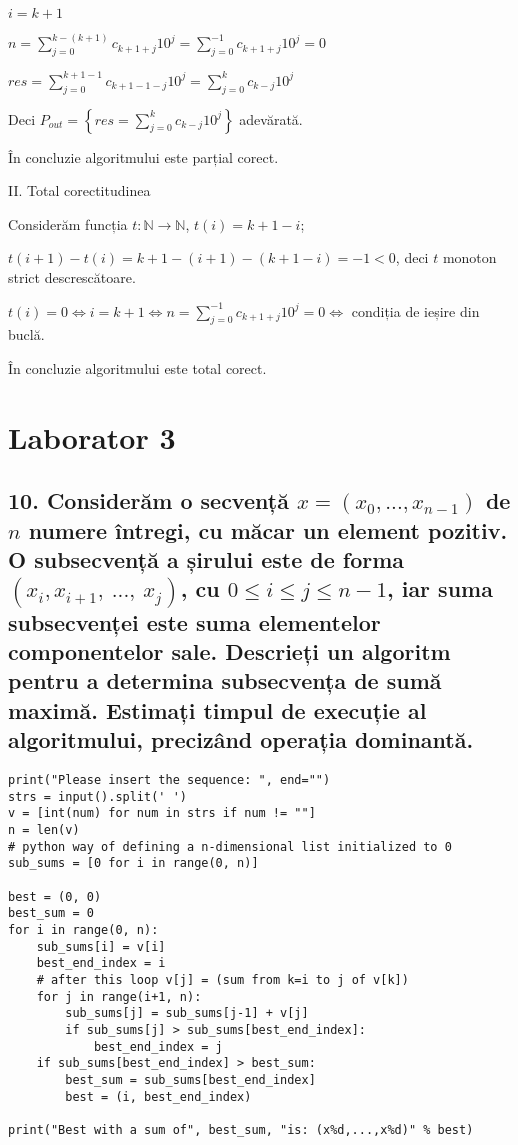 \documentclass[11pt]{article}
\begin{document}
$i = k + 1$

$n = \sum\limits_{j=0}^{k-(k+1)}c_{k+1+j}10^{j}
= \sum\limits_{j=0}^{-1}c_{k+1+j}10^{j} = 0$

$\mathit{res} = \sum\limits_{j=0}^{k+1-1}c_{k+1-1-j}10^{j}
= \sum\limits_{j=0}^{k}c_{k-j}10^{j}$

Deci $P_{out} = \left\{ \mathit{res} = \sum\limits_{j=0}^{k} c_{k-j}10^{j} \right\} $ adevărată.

În concluzie algoritmului este parțial corect.

\vspace{14pt}
\noindent
II. Total corectitudinea
\newline

Considerăm funcția $t: \mathbb{N} \to \mathbb{N}$, $t(i) = k + 1 - i$;

$t(i + 1) - t(i) = k + 1 - (i + 1) - (k + 1 - i) = -1 < 0$, deci $t$ monoton strict descrescătoare.

$t(i) = 0 \iff i = k + 1 \iff n = \sum\limits_{j=0}^{-1}c_{k+1+j}10^{j} = 0\iff$ condiția de ieșire din buclă.

În concluzie algoritmului este total corect.

\pagebreak

\section*{Laborator 3}
\label{sec:org1e5c53a}
\subsection*{10. Considerăm o secvență \(x = (x_{0},..., x_{n-1})\) de \(n\) numere întregi, cu măcar un element pozitiv. O subsecvență a șirului este de forma \((x_{i}, x_{i+1},\ ...,\ x_{j})\), cu \(0 \le i \le j \le n - 1\), iar suma subsecvenței este suma elementelor componentelor sale. Descrieți un algoritm pentru a determina subsecvența de sumă maximă. Estimați timpul de execuție al algoritmului, precizând operația dominantă.}
\label{sec:org3d48753}

\begin{verbatim}
print("Please insert the sequence: ", end="")
strs = input().split(' ')
v = [int(num) for num in strs if num != ""]
n = len(v)
# python way of defining a n-dimensional list initialized to 0
sub_sums = [0 for i in range(0, n)]

best = (0, 0)
best_sum = 0
for i in range(0, n):
    sub_sums[i] = v[i]
    best_end_index = i
    # after this loop v[j] = (sum from k=i to j of v[k])
    for j in range(i+1, n):
        sub_sums[j] = sub_sums[j-1] + v[j]
        if sub_sums[j] > sub_sums[best_end_index]:
            best_end_index = j
    if sub_sums[best_end_index] > best_sum:
        best_sum = sub_sums[best_end_index]
        best = (i, best_end_index)

print("Best with a sum of", best_sum, "is: (x%d,...,x%d)" % best)
\end{verbatim}
\end{document}
